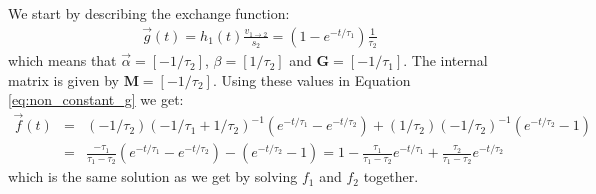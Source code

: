 \documentclass{article}
\begin{document}
We start by describing the exchange function:
\begin{eqnarray}
    \vec{g}(t) = h_1(t) \frac{v_{1 \rightarrow 2}}{s_2} = (1 - e^{-t/\tau_1}) \frac{1}{\tau_2}
\end{eqnarray}
which means that $\vec{\alpha} = [-1/\tau_2]$, $\beta = [1/\tau_2]$ and $\mathbf{G} = [-1/\tau_1]$. The internal matrix is given by $\mathbf{M} = [-1/\tau_2]$. Using these values in Equation \ref{eq:non_constant_g} we get:
\begin{eqnarray}
    \vec{f}(t) &=& (-1/\tau_2) (-1/\tau_1 + 1/\tau_2)^{-1} (e^{-t/\tau_1} - e^{-t/\tau_2}) + (1/\tau_2) (-1/\tau_2)^{-1} (e^{-t/\tau_2} - 1) \nonumber\\
    &=& \frac{-\tau_1}{\tau_1 - \tau_2} (e^{-t/\tau_1} - e^{-t/\tau_2}) - (e^{-t/\tau_2} - 1)
    = 1 - \frac{\tau_1}{\tau_1 - \tau_2} e^{-t/\tau_1} + \frac{\tau_2}{\tau_1 - \tau_2} e^{-t/\tau_2}
\end{eqnarray}
which is the same solution as we get by solving $f_1$ and $f_2$ together.



\end{document}
